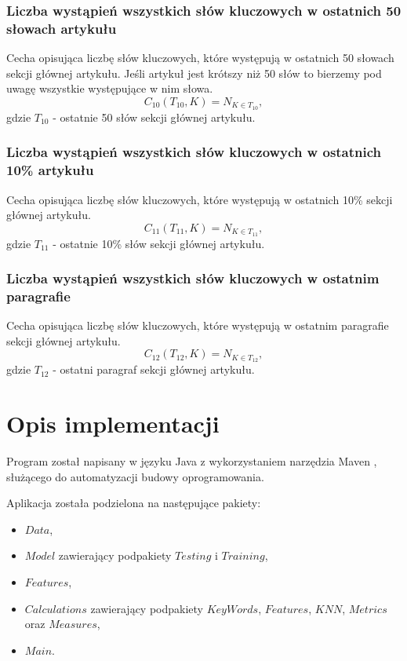 \documentclass{classrep}
\begin{document}
\subsubsection{Liczba wystąpień wszystkich słów kluczowych w ostatnich 50 słowach artykułu}
Cecha opisująca liczbę słów kluczowych, które występują w ostatnich 50 słowach sekcji głównej artykułu. Jeśli artykuł jest krótszy niż 50 słów to bierzemy pod uwagę wszystkie występujące w nim słowa.
\begin{equation}
            C_{10}(T_{10},K) = N_{K \in T_{10}},
 \end{equation}	
 gdzie $T_{10}$ - ostatnie 50 słów sekcji głównej artykułu.

\subsubsection{Liczba wystąpień wszystkich słów kluczowych w ostatnich 10\% artykułu}
Cecha opisująca liczbę słów kluczowych, które występują w ostatnich 10\% sekcji głównej artykułu.
\begin{equation}
            C_{11}(T_{11},K) = N_{K \in T_{11}},
 \end{equation}	
 gdzie $T_{11}$ - ostatnie 10\% słów sekcji głównej artykułu.

\subsubsection{Liczba wystąpień wszystkich słów kluczowych w ostatnim paragrafie}
Cecha opisująca liczbę słów kluczowych, które występują w ostatnim paragrafie sekcji głównej artykułu.
\begin{equation}
            C_{12}(T_{12},K) = N_{K \in T_{12}},
 \end{equation}	
 gdzie $T_{12}$ - ostatni paragraf sekcji głównej artykułu.

\section{Opis implementacji}
Program został napisany w języku Java z wykorzystaniem narzędzia Maven \cite{Maven}, służącego do automatyzacji budowy oprogramowania. \newline

Aplikacja została podzielona na następujące pakiety:
\begin{itemize}[label=$\bullet$\scshape\bfseries]
\item $Data$,
\item $Model$ zawierający podpakiety $Testing$ i $Training$,
\item $Features$,
\item $Calculations$ zawierający podpakiety $KeyWords$, $Features$, $KNN$, $Metrics$ oraz $Measures$,
\item $Main$.
\end{itemize}
\end{document}
